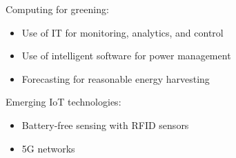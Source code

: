 \documentclass[twoside]{article}
\begin{document}
Computing for greening:
\begin{itemize}
  \item Use of IT for monitoring, analytics, and control
  \item Use of intelligent software for power management
  \item Forecasting for reasonable energy harvesting
\end{itemize}
Emerging IoT technologies: 
\begin{itemize}
  \item Battery-free sensing with RFID sensors
  \item 5G networks
\end{itemize}
\end{document}

